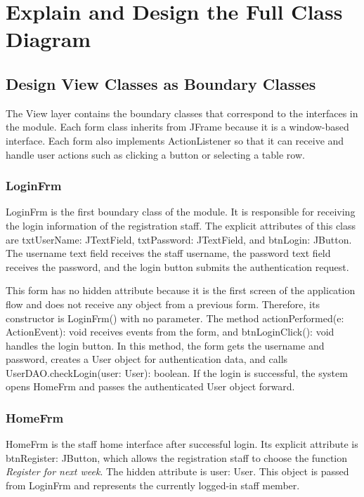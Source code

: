 \section{Explain and Design the Full Class Diagram}


\subsection{Design View Classes as Boundary Classes}

The View layer contains the boundary classes that correspond to the interfaces in the module. Each form class inherits from JFrame because it is a window-based interface. Each form also implements ActionListener so that it can receive and handle user actions such as clicking a button or selecting a table row.

\subsubsection{LoginFrm}

LoginFrm is the first boundary class of the module. It is responsible for receiving the login information of the registration staff. The explicit attributes of this class are txtUserName: JTextField, txtPassword: JTextField, and btnLogin: JButton. The username text field receives the staff username, the password text field receives the password, and the login button submits the authentication request.

This form has no hidden attribute because it is the first screen of the application flow and does not receive any object from a previous form. Therefore, its constructor is LoginFrm() with no parameter. The method actionPerformed(e: ActionEvent): void receives events from the form, and btnLoginClick(): void handles the login button. In this method, the form gets the username and password, creates a User object for authentication data, and calls UserDAO.checkLogin(user: User): boolean. If the login is successful, the system opens HomeFrm and passes the authenticated User object forward.

\subsubsection{HomeFrm}

HomeFrm is the staff home interface after successful login. Its explicit attribute is btnRegister: JButton, which allows the registration staff to choose the function \textit{Register for next week}. The hidden attribute is user: User. This object is passed from LoginFrm and represents the currently logged-in staff member.

